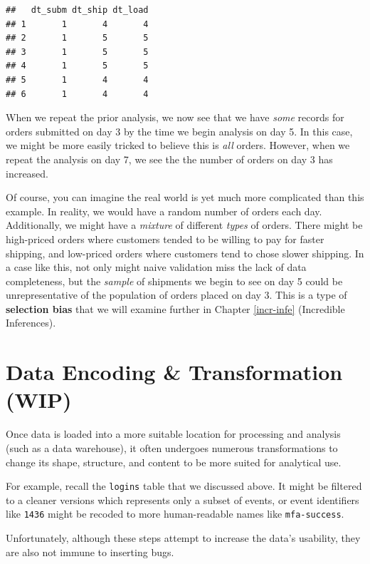 \documentclass[
]{krantz}
\begin{document}
\begin{verbatim}
##   dt_subm dt_ship dt_load
## 1       1       4       4
## 2       1       5       5
## 3       1       5       5
## 4       1       5       5
## 5       1       4       4
## 6       1       4       4
\end{verbatim}

When we repeat the prior analysis, we now see that we have \emph{some} records for orders submitted on day 3 by the time we begin analysis on day 5.
In this case, we might be more easily tricked to believe this is \emph{all} orders.
However, when we repeat the analysis on day 7, we see the the number of orders on day 3 has increased.

Of course, you can imagine the real world is yet much more complicated than this example.
In reality, we would have a random number of orders each day.
Additionally, we might have a \emph{mixture} of different \emph{types} of orders.
There might be high-priced orders where customers tended to be willing to pay for faster shipping,
and low-priced orders where customers tend to chose slower shipping.
In a case like this, not only might naive validation miss the lack of data completeness, but the \emph{sample} of shipments we begin to see on day 5 could be unrepresentative of the population of orders placed on day 3.
This is a type of \textbf{selection bias} that we will examine further in Chapter \ref{incr-infe} (Incredible Inferences).

\hypertarget{data-encoding-transformation-wip}{%
\section{Data Encoding \& Transformation (WIP)}\label{data-encoding-transformation-wip}}

Once data is loaded into a more suitable location for processing and analysis (such as a data warehouse), it often undergoes numerous transformations to change its shape, structure, and content to be more suited for analytical use.

For example, recall the \texttt{logins} table that we discussed above. It might be filtered to a cleaner versions which represents only a subset of events, or event identifiers like \texttt{\textquotesingle{}1436\textquotesingle{}} might be recoded to more human-readable names like \texttt{\textquotesingle{}mfa-success\textquotesingle{}}.

Unfortunately, although these steps attempt to increase the data's usability, they are also not immune to inserting bugs.
\end{document}
